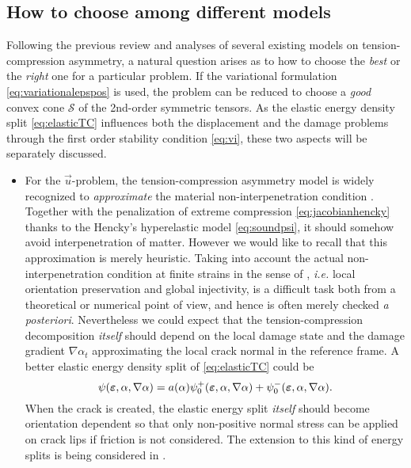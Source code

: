 \subsection{How to choose among different models} \label{sec:howtochoose}
Following the previous review and analyses of several existing models on tension-compression asymmetry, a natural question arises as to how to choose the \emph{best} or the \emph{right} one for a particular problem. If the variational formulation \eqref{eq:variationalepspos} is used, the problem can be reduced to choose a \emph{good} convex cone $\mathcal{S}$ of the 2nd-order symmetric tensors. As the elastic energy density split \eqref{eq:elasticTC} influences both the displacement and the damage problems through the first order stability condition \eqref{eq:vi}, these two aspects will be separately discussed.
\begin{itemize}
\item For the $\vec{u}$-problem, the tension-compression asymmetry model is widely recognized to \emph{approximate} the material non-interpenetration condition \cite{LancioniRoyer-Carfagni:2009,AmorMarigoMaurini:2009,AmbatiGerasimovLorenzis:2015}. Together with the penalization of extreme compression \eqref{eq:jacobianhencky} thanks to the Hencky's hyperelastic model \eqref{eq:soundpsi}, it should somehow avoid interpenetration of matter. However we would like to recall that this approximation is merely heuristic. Taking into account the actual non-interpenetration condition at finite strains in the sense of \cite{CiarletNecas:1987}, \emph{i.e.} local orientation preservation and global injectivity, is a difficult task both from a theoretical or numerical point of view, and hence is often merely checked \emph{a posteriori}. Nevertheless we could expect that the tension-compression decomposition \emph{itself} should depend on the local damage state and the damage gradient $\nabla\alpha_t$ approximating the local crack normal in the reference frame. A better elastic energy density split of \eqref{eq:elasticTC} could be
\begin{equation}
\psi(\eps,\alpha,\nabla\alpha)=a(\alpha)\psi_0^+(\eps,\alpha,\nabla\alpha)+\psi_0^-(\eps,\alpha,\nabla\alpha).
\end{equation}
When the crack is created, the elastic energy split \emph{itself} should become orientation dependent so that only non-positive normal stress can be applied on crack lips if friction is not considered. The extension to this kind of energy splits is being considered in \cite{StroblSeelig:2015}.


\end{itemize}

